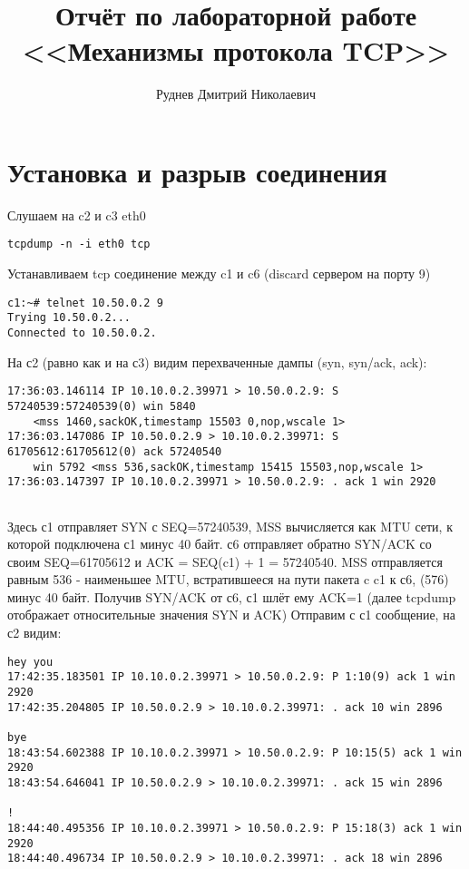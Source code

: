 \documentclass[a4paper,12pt]{article}
\title{Отчёт по лабораторной работе \\ <<Механизмы протокола TCP>>}
\author{Руднев Дмитрий Николаевич}
\begin{document}
\maketitle

\tableofcontents


\section{Установка и разрыв соединения}

Слушаем на c2 и c3 eth0

\begin{Verbatim}
tcpdump -n -i eth0 tcp
\end{Verbatim}

Устанавливаем tcp соединение между c1 и c6 (discard сервером на порту 9)

\begin{Verbatim}
c1:~# telnet 10.50.0.2 9
Trying 10.50.0.2...
Connected to 10.50.0.2.
\end{Verbatim}

На с2 (равно как и на с3) видим перехваченные дампы (syn, syn/ack, ack):

\begin{Verbatim}
17:36:03.146114 IP 10.10.0.2.39971 > 10.50.0.2.9: S 57240539:57240539(0) win 5840 
	<mss 1460,sackOK,timestamp 15503 0,nop,wscale 1>
17:36:03.147086 IP 10.50.0.2.9 > 10.10.0.2.39971: S 61705612:61705612(0) ack 57240540 
	win 5792 <mss 536,sackOK,timestamp 15415 15503,nop,wscale 1>
17:36:03.147397 IP 10.10.0.2.39971 > 10.50.0.2.9: . ack 1 win 2920 
	
\end{Verbatim}

Здесь с1 отправляет SYN с SEQ=57240539, MSS вычисляется как MTU сети, к которой подключена с1 минус 40 байт.
с6 отправляет обратно SYN/ACK со своим SEQ=61705612 и ACK = SEQ(c1) + 1 = 57240540. MSS отправляется равным 
536 - наименьшее MTU, встратившееся на пути пакета c c1 к с6, (576) минус 40 байт.
Получив SYN/ACK от с6, с1 шлёт ему ACK=1 (далее tcpdump отображает относительные значения SYN и ACK)
\vspace*{\baselineskip}
Отправим с с1 сообщение, на с2 видим:

\begin{Verbatim}
hey you
17:42:35.183501 IP 10.10.0.2.39971 > 10.50.0.2.9: P 1:10(9) ack 1 win 2920 
17:42:35.204805 IP 10.50.0.2.9 > 10.10.0.2.39971: . ack 10 win 2896 

bye
18:43:54.602388 IP 10.10.0.2.39971 > 10.50.0.2.9: P 10:15(5) ack 1 win 2920 
18:43:54.646041 IP 10.50.0.2.9 > 10.10.0.2.39971: . ack 15 win 2896 

!
18:44:40.495356 IP 10.10.0.2.39971 > 10.50.0.2.9: P 15:18(3) ack 1 win 2920 
18:44:40.496734 IP 10.50.0.2.9 > 10.10.0.2.39971: . ack 18 win 2896 
\end{Verbatim}
\end{document}
